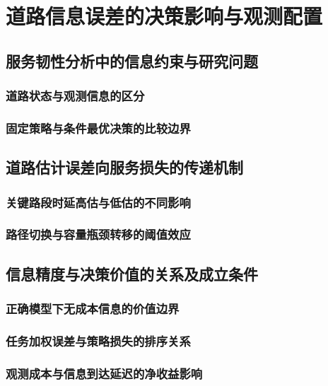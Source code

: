 \chapter{道路信息误差的决策影响与观测配置}
\label{chap:information}

\section{服务韧性分析中的信息约束与研究问题}
\subsection{道路状态与观测信息的区分}
\subsection{固定策略与条件最优决策的比较边界}

\ThesisBlank

\section{道路估计误差向服务损失的传递机制}
\subsection{关键路段时延高估与低估的不同影响}
\subsection{路径切换与容量瓶颈转移的阈值效应}

\ThesisBlank

\section{信息精度与决策价值的关系及成立条件}
\subsection{正确模型下无成本信息的价值边界}
\subsection{任务加权误差与策略损失的排序关系}
\subsection{观测成本与信息到达延迟的净收益影响}

